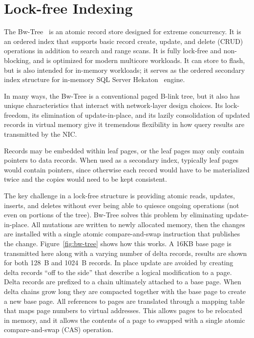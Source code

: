 \section{Lock-free Indexing}
\label{sec:bwtree-intro}
The Bw-Tree~\cite{bw-tree} is an atomic record store designed for extreme
concurrency. It is an ordered index that supports basic record create, update,
and delete (CRUD) operations in addition to search and range scans.  It is
fully lock-free and non-blocking, and is optimized for modern multicore
workloads. It can store to flash, but is also intended for in-memory
workloads; it serves as the ordered secondary index structure for in-memory SQL
Server Hekaton~\cite{hekaton} engine.

In many ways, the Bw-Tree is a conventional paged B-link tree,
but it also has unique characteristics that interact with network-layer
design choices. Its lock-freedom, its elimination of update-in-place,
and its lazily consolidation of updated records in virtual memory give it
tremendous flexibility in how query results are transmitted by the NIC.

Records may be embedded within leaf pages, or the leaf pages may
only contain pointers to data records. When used as a secondary index,
typically leaf pages would contain pointers, since otherwise each record would
have to be materialized twice and the copies would need to be kept consistent.


The key challenge in a lock-free structure is providing atomic reads, updates,
inserts, and deletes without ever being able to quiesce ongoing operations (not
even on portions of the tree). Bw-Tree solves this problem by eliminating
update-in-place. All mutations are written to newly allocated memory, then
the changes are installed with a single atomic compare-and-swap instruction
that publishes the change.  Figure~\ref{fig:bw-tree} shows how this works.
A 16KB base page is transmitted here along with a varying number of delta records,
results are shown for both 128~B and 1024~B records.
In place update are avoided by creating delta records ``off to the side'' 
that describe a logical modification to a page. Delta records are
prefixed to a chain ultimately attached to a base page.  When delta chains
grow long they are compacted together with the base page to create a new base page.
All references to pages are translated through a mapping table that maps page
numbers to virtual addresses. This allows pages to be relocated in memory, and
it allows the contents of a page to swapped with a single atomic
compare-and-swap (CAS) operation.


